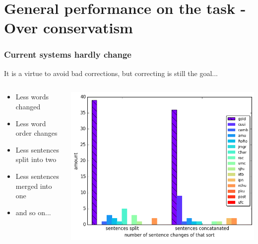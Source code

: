 \documentclass{beamer}
\begin{document}
\section{General performance on the task - Over conservatism}
\begin{frame}
	\frametitle{Current systems hardly change}
It is a virtue to avoid bad corrections, but correcting is still the goal...
	 \begin{columns}[T]
	 	\begin{column}{.5\textwidth}
	 		\begin{block}{}
	 			
	 			\begin{itemize}
	 				\item Less words changed
	 				\item Less word order changes
	 				\item Less sentences split into two
	 				\item Less sentences merged into one
	 				\item and so on...
	 			\end{itemize}
	 		\end{block}
	 	\end{column}
	 	\begin{column}{.5\textwidth}
	 		\begin{block}{}
	 			\includegraphics[width = \textwidth]{aligned}
	 		\end{block}
	 	\end{column}
	 \end{columns}
\end{frame}
\end{document}
